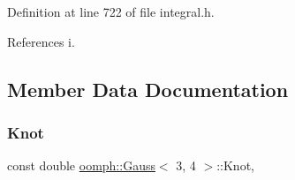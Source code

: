 Definition at line 722 of file integral.\+h.



References i.



\subsection{Member Data Documentation}
\mbox{\label{classoomph_1_1Gauss_3_013_00_014_01_4_a0e5dfa717c94114012925da0bdaa2c84}} 
\subsubsection{\texorpdfstring{Knot}{Knot}}
{\footnotesize\ttfamily const double \hyperlink{classoomph_1_1Gauss}{oomph\+::\+Gauss}$<$ 3, 4 $>$\+::Knot\hspace{0.3cm}{\ttfamily [static]}, {\ttfamily [private]}}

